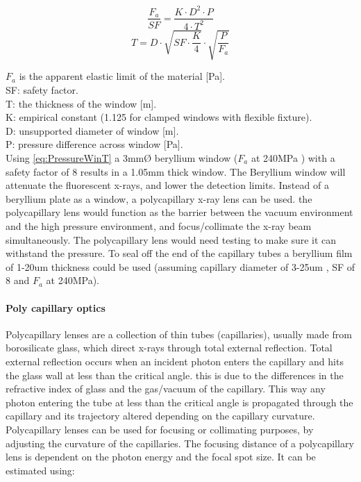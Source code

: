 \begin{equation}
\frac{F_a}{SF} = \frac{K \cdot D^2 \cdot P}{4 \cdot T^2} 
\end{equation}
\begin{equation}
\label{eq:PressureWinT}
T = D \cdot \sqrt{SF \cdot \frac{K}{4}} \cdot \sqrt{\frac{P}{F_a}}
\end{equation}

\noindent$F_a$ is the apparent elastic limit of the material [Pa].\\
SF: safety factor.\\
T: the thickness of the window [m].\\
K: empirical constant (1.125 for clamped windows with flexible fixture).\\
D: unsupported diameter of window [m].\\
P: pressure difference across window [Pa].\\

Using \ref{eq:PressureWinT} a 3mmØ beryllium window ($F_a$ at 240MPa \citep{BeMechanical}) with a safety factor of 8 results in a 1.05mm thick window. The Beryllium window will attenuate the fluorescent x-rays, and lower the detection limits.
Instead of a beryllium plate as a window, a polycapillary x-ray lens can be used. the polycapillary lens would function as the barrier between the vacuum environment and the high pressure environment, and focus/collimate the x-ray beam simultaneously. The polycapillary lens would need testing to make sure it can withstand the pressure. To seal off the end of the capillary tubes a beryllium film of 1-20um thickness could be used (assuming capillary diameter of 3-25um \citep{Shaik_1995}, SF of 8 and $F_a$ at 240MPa).


\paragraph{Poly capillary optics}
Polycapillary lenses are a collection of thin tubes (capillaries), usually made from borosilicate glass, which direct x-rays through total external reflection. Total external reflection occurs when an incident photon enters the capillary and hits the glass wall at less than the critical angle. this is due to the differences in the refractive index of glass and the gas/vacuum of the capillary. This way any photon entering the tube at less than the critical angle is propagated through the capillary and its trajectory altered depending on the capillary curvature. Polycapillary lenses can be used for focusing or collimating purposes, by adjusting the curvature of the capillaries.
The focusing distance of a polycapillary lens is dependent on the photon energy and the focal spot size. It can be estimated using\citep{Shaik_1995}:

